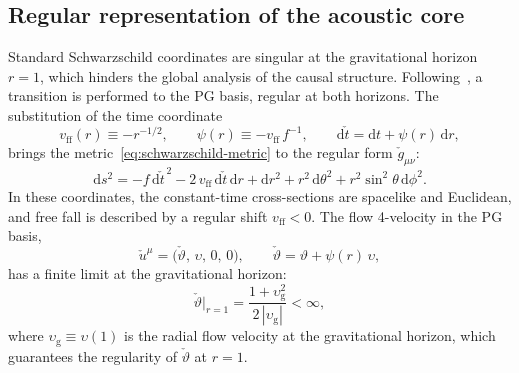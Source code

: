 \documentclass[12pt,a4paper,preprint]{elsarticle}
\begin{document}
        \subsection{Regular representation of the acoustic core}\label{subsec:pg-core}
            Standard Schwarzschild coordinates are singular at the gravitational horizon $r = 1$, which hinders the global analysis of the causal structure. Following~\cite{SemyannikovAV_GlobalAcousticGeometryOfMichelFlowInPainleveGullstrandCoordinates_2026}, a transition is performed to the PG basis, regular at both horizons. The substitution of the time coordinate
            \begin{equation}
                v_{\mathrm{ff}}(r) \equiv -r^{-1/2}, \qquad \psi(r) \equiv -v_{\mathrm{ff}}\,f^{-1}, \qquad \mathrm{d}\check{t} = \mathrm{d}t + \psi(r)\,\mathrm{d}r,
                \label{eq:pg-transformation}
            \end{equation}
            brings the metric~\eqref{eq:schwarzschild-metric} to the regular form $\check{g}_{\mu\nu}$:
            \begin{equation}
                \mathrm{d}s^{2} = -f\,\mathrm{d}\check{t}^{\,2} - 2\,v_{\mathrm{ff}}\,\mathrm{d}\check{t}\,\mathrm{d}r + \mathrm{d}r^{2} + r^{2}\,\mathrm{d}\theta^{2} + r^{2}\sin^{2}\!\theta\,\mathrm{d}\phi^{2}.
                \label{eq:pg-metric}
            \end{equation}
            In these coordinates, the constant-time cross-sections are spacelike and Euclidean, and free fall is described by a regular shift $v_{\mathrm{ff}} < 0$. The flow 4-velocity in the PG basis,
            \begin{equation}
                \check{u}^{\mu} = \bigl(\check{\vartheta},\,\upsilon,\,0,\,0\bigr), \qquad \check{\vartheta} = \vartheta + \psi(r)\,\upsilon,
                \label{eq:four-velocity-pg}
            \end{equation}
            has a finite limit at the gravitational horizon:
            \begin{equation}
                \check{\vartheta}\big|_{r=1} = \frac{1 + \upsilon_{\mathrm{g}}^{2}}{2\,|\upsilon_{\mathrm{g}}|} < \infty,
                \label{eq:vartheta-limit}
            \end{equation}
            where $\upsilon_{\mathrm{g}} \equiv \upsilon(1)$ is the radial flow velocity at the gravitational horizon, which guarantees the regularity of $\check{\vartheta}$ at $r = 1$.
            
\end{document}
